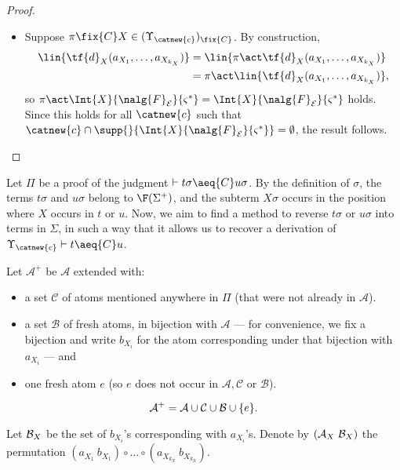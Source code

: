 \begin{proof}
\begin{enumerate}
\begin{itemize}
        \item Suppose $\pi\fix{C} X\in (\Upsilon_{\catnew{c}})_{\fix{C}}$.  By construction,
        \begin{align*}
             \lin{\tf{d}_X(a_{X_1},\ldots,a_{X_{k_X}})} &= \lin{\pi\act\tf{d}_X(a_{X_1},\ldots,a_{X_{k_X}})}\\
             &= \pi\act \lin{\tf{d}_X(a_{X_1},\ldots,a_{X_{k_X}})},
        \end{align*}
        so $\pi\act \Int{X}{\nalg{F}_{\cal E}}{\varsigma^*} = \Int{X}{\nalg{F}_{\cal E}}{\varsigma^*}$ holds. Since this holds for all $\catnew{c}$ such that  $\catnew{c}\cap\supp{}{ \Int{X}{\nalg{F}_{\cal E}}{\varsigma^*}} = \emptyset$, the result follows.
    \end{itemize}
    \end{enumerate}
\end{proof}

Let $\Pi$ be a proof of the judgment$~\vdash t\sigma \aeq{C} u\sigma$. By the definition of $\sigma$, the terms $t\sigma$ and $u\sigma$ belong to $\F(\Sigma^+)$, and the subterm $X\sigma$ occurs in the position where $X$ occurs in $t$ or $u$.  Now, we aim to find a method to reverse $t\sigma$ or $u\sigma$ into terms in $\Sigma$, in such a way that it allows us to recover a derivation of $\Upsilon_{\catnew{c}} \vdash t\aeq{C} u$.

\begin{definition}
    Let $\mathcal{A}^+$ be $\mathcal{A}$ extended with:
    \begin{itemize}
        \item a set $\mathcal{C}$ of atoms mentioned anywhere in $\Pi$ (that were not already in $\mathcal{A}$).

        \item a set $\mathcal{B}$ of fresh atoms, in bijection with $\mathcal{A}$ — for convenience, we fix a bijection and write $b_{X_i}$ for the atom corresponding under that bijection with $a_{X_i}$ — and


        \item one fresh atom $e$ (so $e$ does not occur in $\mathcal{A}, \mathcal{C}$ or $\mathcal{B}$).
    \end{itemize}
    \[
        {\cal A}^+ = {\cal A\cup C\cup B}\cup\{e\}.
    \]
\end{definition}

Let ${\cal B}_X$ be the set of $b_{X_i}$'s corresponding with $a_{X_i}$'s. Denote by $({\cal A}_X \ {\cal B}_X)$ the permutation $(a_{X_1} \ b_{X_1})\circ \ldots\circ (a_{X_{k_X}} \ b_{X_{k_X}})$.


